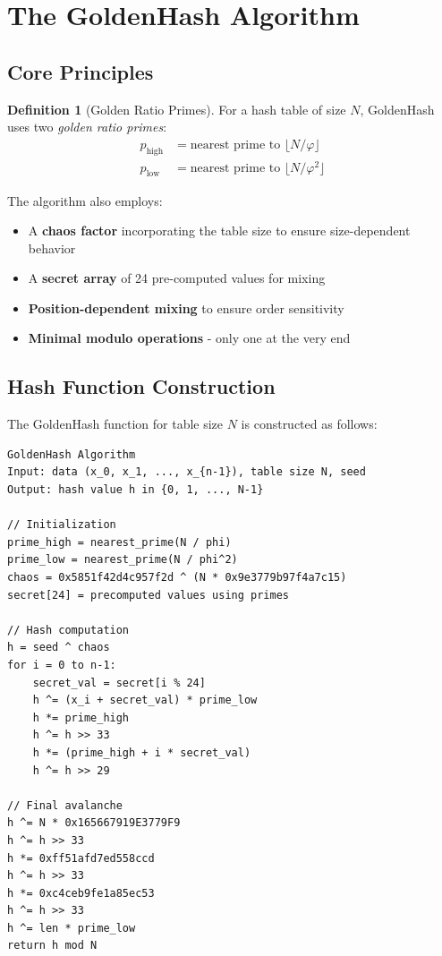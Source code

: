 \documentclass[11pt,a4paper]{article}
\theoremstyle{definition}
\newtheorem{definition}{Definition}
\begin{document}
\section{The GoldenHash Algorithm}

\subsection{Core Principles}

\begin{definition}[Golden Ratio Primes]
For a hash table of size $N$, GoldenHash uses two \emph{golden ratio primes}:
\begin{align}
p_{\text{high}} &= \text{nearest prime to } \lfloor N/\varphi \rfloor \\
p_{\text{low}} &= \text{nearest prime to } \lfloor N/\varphi^2 \rfloor
\end{align}
\end{definition}

The algorithm also employs:
\begin{itemize}
\item A \textbf{chaos factor} incorporating the table size to ensure size-dependent behavior
\item A \textbf{secret array} of 24 pre-computed values for mixing
\item \textbf{Position-dependent mixing} to ensure order sensitivity
\item \textbf{Minimal modulo operations} - only one at the very end
\end{itemize}

\subsection{Hash Function Construction}

The GoldenHash function for table size $N$ is constructed as follows:

\begin{verbatim}
GoldenHash Algorithm
Input: data (x_0, x_1, ..., x_{n-1}), table size N, seed
Output: hash value h in {0, 1, ..., N-1}

// Initialization
prime_high = nearest_prime(N / phi)
prime_low = nearest_prime(N / phi^2)
chaos = 0x5851f42d4c957f2d ^ (N * 0x9e3779b97f4a7c15)
secret[24] = precomputed values using primes

// Hash computation
h = seed ^ chaos
for i = 0 to n-1:
    secret_val = secret[i % 24]
    h ^= (x_i + secret_val) * prime_low
    h *= prime_high
    h ^= h >> 33
    h *= (prime_high + i * secret_val)
    h ^= h >> 29

// Final avalanche
h ^= N * 0x165667919E3779F9
h ^= h >> 33
h *= 0xff51afd7ed558ccd
h ^= h >> 33
h *= 0xc4ceb9fe1a85ec53
h ^= h >> 33
h ^= len * prime_low
return h mod N
\end{verbatim}
\end{document}
